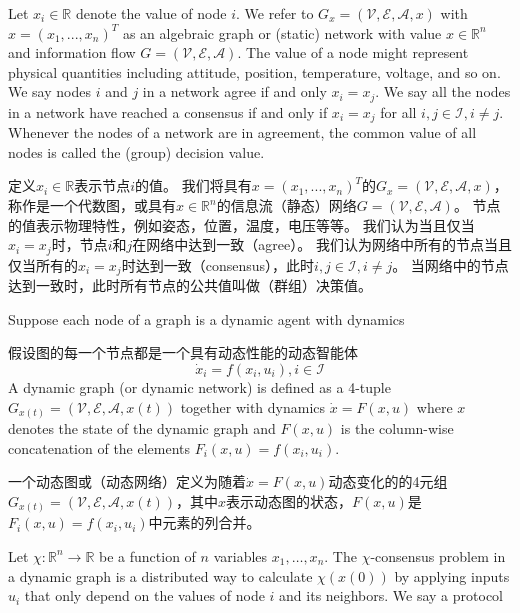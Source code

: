 \documentclass{article}
\begin{document}
{\color[gray]{0.5}
Let $x_i\in \mathbb{R}$ denote the value of node $i$. 
We refer to $G_x=(\mathcal{V},\mathcal{E},\mathcal{A},x)$ with $x=(x_1,...,x_n)^T$ as an algebraic graph or (static) network with value $x\in \mathbb{R}^n$ and information ﬂow $G=(\mathcal{V},\mathcal{E},\mathcal{A})$. 
The value of a node might represent physical quantities including attitude, position, temperature, voltage, and so on. 
We say nodes $i$ and $j$ in a network agree if and only $x_i=x_j$. 
We say all the nodes in a network have reached a consensus if and only if $x_i=x_j$ for all $i,j\in \mathcal{I}, i\ne j$. 
Whenever the nodes of a network are in agreement, the common value of all nodes is called the (group) decision value.
}

定义$x_i\in \mathbb{R}$表示节点$i$的值。
我们将具有$x=(x_1,...,x_n)^T$的$G_x=(\mathcal{V},\mathcal{E},\mathcal{A},x)$，称作是一个代数图，或具有$x\in \mathbb{R}^n$的信息流（静态）网络$G=(\mathcal{V},\mathcal{E},\mathcal{A})$。
节点的值表示物理特性，例如姿态，位置，温度，电压等等。
我们认为当且仅当$x_i=x_j$时，节点$i$和$j$在网络中达到一致（agree）。
我们认为网络中所有的节点当且仅当所有的$x_i=x_j$时达到一致（consensus），此时$i,j\in \mathcal{I}, i\ne j$。
当网络中的节点达到一致时，此时所有节点的公共值叫做（群组）决策值。

{\color[gray]{0.5}
Suppose each node of a graph is a dynamic agent with dynamics
}

假设图的每一个节点都是一个具有动态性能的动态智能体
\begin{equation}
    \dot{x}_i = f(x_i, u_i), i\in \mathcal{I}
    \tag{2}
    \label{2}
\end{equation}
{\color[gray]{0.5}
\noindent A dynamic graph (or dynamic network) is deﬁned as a 4-tuple $G_{x(t)} = (\mathcal{V},\mathcal{E},\mathcal{A},x(t))$ together with dynamics $\dot{x}=F(x,u)$ where $x$ denotes the state of the dynamic graph and {\color{green}$F(x,u)$ is the column-wise concatenation of the elements $F_i(x,u)=f(x_i,u_i)$}.
}

\noindent 一个动态图或（动态网络）定义为随着$\dot{x}=F(x,u)$动态变化的的4元组$G_{x(t)} = (\mathcal{V},\mathcal{E},\mathcal{A},x(t))$，其中$x$表示动态图的状态，$F(x,u)$是$F_i(x,u)=f(x_i,u_i)$中元素的列合并。

{\color[gray]{0.5}
Let $\chi: \mathbb{R}^n \rightarrow \mathbb{R}$ be a function of $n$ variables $x_1,\dots,x_n$. 
The $\chi$-consensus problem in a dynamic graph is a distributed way to calculate $\chi(x(0))$ by applying inputs $u_i$ that only depend on the values of node $i$ and its neighbors. 
We say a protocol
}
\end{document}
